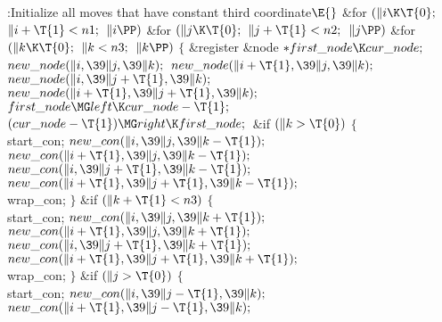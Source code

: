 \B{}:Initialize all moves that have constant third
coordinate\X${}\E{}$\6
\&{for} ${}(\|i\K\T{0};{}$ ${}\|i+\T{1}<\\{n1};{}$ ${}\|i\PP){}$\1\6
\&{for} ${}(\|j\K\T{0};{}$ ${}\|j+\T{1}<\\{n2};{}$ ${}\|j\PP){}$\1\6
\&{for} ${}(\|k\K\T{0};{}$ ${}\|k<\\{n3};{}$ ${}\|k\PP){}$\5
${}\{{}$\1\6
\&{register} \&{node} ${}{*}\\{first\_node}\K\\{cur\_node};{}$\7
${}\\{new\_node}(\|i,\39\|j,\39\|k);{}$\6
${}\\{new\_node}(\|i+\T{1},\39\|j,\39\|k);{}$\6
${}\\{new\_node}(\|i,\39\|j+\T{1},\39\|k);{}$\6
${}\\{new\_node}(\|i+\T{1},\39\|j+\T{1},\39\|k);{}$\6
${}\\{first\_node}\MG\\{left}\K\\{cur\_node}-\T{1};{}$\6
${}(\\{cur\_node}-\T{1})\MG\\{right}\K\\{first\_node};{}$\6
\&{if} ${}(\|k>\T{0}){}$\5
${}\{{}$\1\6
\\{start\_con};\6
${}\\{new\_con}(\|i,\39\|j,\39\|k-\T{1});{}$\6
${}\\{new\_con}(\|i+\T{1},\39\|j,\39\|k-\T{1});{}$\6
${}\\{new\_con}(\|i,\39\|j+\T{1},\39\|k-\T{1});{}$\6
${}\\{new\_con}(\|i+\T{1},\39\|j+\T{1},\39\|k-\T{1});{}$\6
\\{wrap\_con};\6
\4${}\}{}$\2\6
\&{if} ${}(\|k+\T{1}<\\{n3}){}$\5
${}\{{}$\1\6
\\{start\_con};\6
${}\\{new\_con}(\|i,\39\|j,\39\|k+\T{1});{}$\6
${}\\{new\_con}(\|i+\T{1},\39\|j,\39\|k+\T{1});{}$\6
${}\\{new\_con}(\|i,\39\|j+\T{1},\39\|k+\T{1});{}$\6
${}\\{new\_con}(\|i+\T{1},\39\|j+\T{1},\39\|k+\T{1});{}$\6
\\{wrap\_con};\6
\4${}\}{}$\2\6
\&{if} ${}(\|j>\T{0}){}$\5
${}\{{}$\1\6
\\{start\_con};\6
${}\\{new\_con}(\|i,\39\|j-\T{1},\39\|k);{}$\6
${}\\{new\_con}(\|i+\T{1},\39\|j-\T{1},\39\|k);{}$\6
